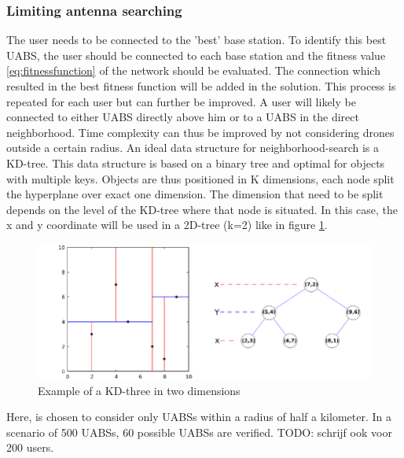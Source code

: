 \subsubsection{Limiting antenna searching}
The user needs to be connected to the 'best' base station. To identify this best \gls{UABS}, the user should be connected 
to each base station and the fitness value \ref{eq:fitnessfunction} of the network should be evaluated. The connection which resulted in the best fitness function
will be added in the solution. This process is repeated for each user but can further be improved. A user will likely be connected to either 
\gls{UABS} directly above him or to a \gls{UABS} in the direct neighborhood. Time complexity can thus be improved by not considering drones 
outside a certain radius.
An ideal data structure for neighborhood-search is a KD-tree. This data structure is based on a binary tree and optimal for objects with 
multiple keys. Objects are thus positioned in K dimensions, each node split the hyperplane over exact one dimension. The dimension that need 
to be split depends on the level of the KD-tree where that node is situated.
In this case, the x and y coordinate will be used in a 2D-tree (k=2) like in figure \ref{fig:exampleKDtree}.

\begin{figure}[H]
  \includegraphics[width=\textwidth]{../images/Example-of-a-2D-k-d-tree.png}
  \caption{Example of a KD-three in two dimensions}
  \label{fig:exampleKDtree}
\end{figure}


Here, is chosen to consider only \gls{UABS}s within a radius of half a kilometer. In a scenario of 500 \gls{UABS}s, 60 possible \gls{UABS}s are verified.
TODO: schrijf ook voor 200 users.
